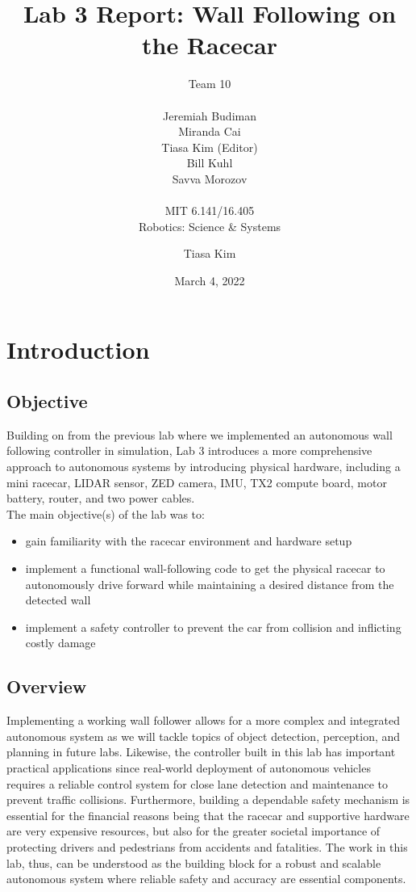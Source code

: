 \documentclass{article}
\title{Lab 3 Report: Wall Following on the Racecar} %
\author{Team 10 \\\\ Jeremiah Budiman \\ Miranda Cai \\ Tiasa Kim (Editor)\\ Bill Kuhl \\ Savva Morozov \\\\ MIT 6.141/16.405 \\ Robotics: Science \& Systems\\} %
\date{March 4, 2022} %
\begin{document}
\maketitle
\section{Introduction}
\author{Tiasa Kim}

\subsection{Objective}
Building on from the previous lab where we implemented an autonomous wall following controller in simulation, Lab 3 introduces a more comprehensive approach to autonomous systems by introducing physical hardware, including a mini racecar, LIDAR sensor, ZED camera, IMU, TX2 compute board, motor battery, router, and two power cables. \\

The main objective(s) of the lab was to: 
\begin{itemize}
    \item gain familiarity with the racecar environment and hardware setup
    \item implement a functional wall-following code to get the physical racecar to autonomously drive forward while maintaining a desired distance from the detected wall
    \item implement a safety controller to prevent the car from collision and inflicting costly damage
\end{itemize}

\subsection{Overview}
Implementing a working wall follower allows for a more complex and integrated autonomous system as we will tackle topics of object detection, perception, and planning in future labs. Likewise, the controller built in this lab has important practical applications since real-world deployment of autonomous vehicles requires a reliable control system for close lane detection and maintenance to prevent traffic collisions. Furthermore, building a dependable safety mechanism is essential for the financial reasons being that the racecar and supportive hardware are very expensive resources, but also for the greater societal importance of protecting drivers and pedestrians from accidents and fatalities. The work in this lab, thus, can be understood as the building block for a robust and scalable autonomous system where reliable safety and accuracy are essential components. \\
\end{document}

